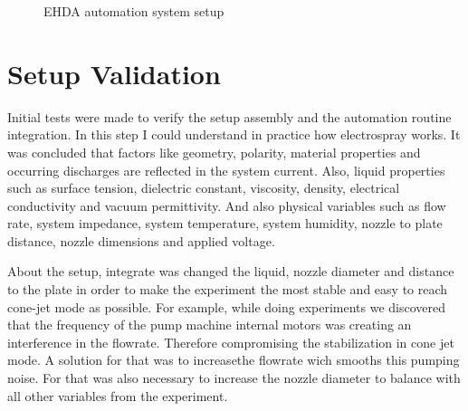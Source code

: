 \begin{figure}[H]
  \centering
  \caption{EHDA automation system setup}
  \label{fig:setup_pic}
\end{figure}


\section{Setup Validation}
\label{sec:setup_validation}


Initial tests were made to verify the setup assembly and the automation routine integration. In this step I could understand in practice how electrospray works.
It was concluded that factors like geometry, polarity, material properties and occurring discharges are reflected in the system current.
Also, liquid properties such as surface tension, dielectric constant, viscosity, density, electrical conductivity and vacuum permittivity. 
 And also physical variables such as flow rate, system impedance, system temperature, system humidity, nozzle to plate distance, nozzle dimensions and applied voltage.


 About the setup, integrate was changed the liquid, nozzle diameter and distance to the plate in order to
make the experiment the most stable and easy to reach cone-jet mode as possible. For example, while doing experiments we discovered that the frequency of the pump machine internal motors was creating an interference in the flowrate. Therefore compromising the stabilization in cone jet mode. A solution for that was to increasethe flowrate wich smooths this pumping noise. For that was also necessary to increase the nozzle diameter to balance with all other variables from the experiment.


